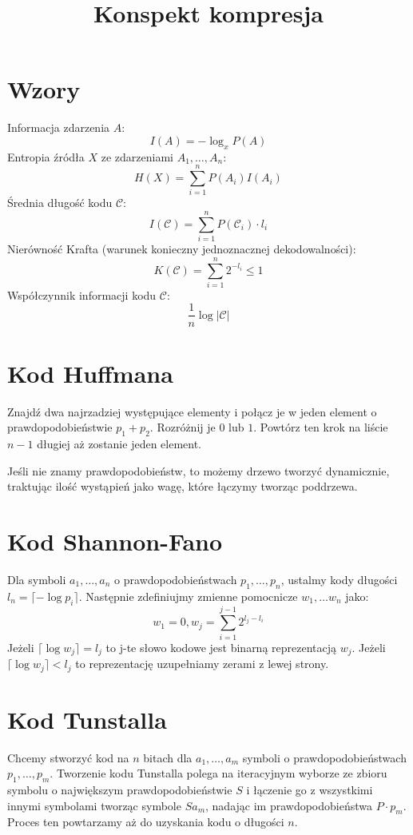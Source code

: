 \documentclass{../notatki}
\title{Konspekt kompresja}
\begin{document}
\begin{multicols}{2}

  \section{Wzory}

  Informacja zdarzenia $A$:
  $$
  I(A) = -\log_xP(A)
  $$
  Entropia źródła $X$ ze zdarzeniami $A_1, \dots, A_n$:
  $$
  H(X) = \sum_{i=1}^{n}P(A_i)I(A_i)
  $$
  Średnia długość kodu $\mathcal{C}$:
  $$
  I(\mathcal{C}) = \sum_{i=1}^{n}P(\mathcal{C}_i) \cdot l_i
  $$
  Nierówność Krafta (warunek konieczny jednoznacznej dekodowalności):
  $$
  K(\mathcal{C}) = \sum_{i=1}^{n}2^{-l_i} \leq 1
  $$
  Współczynnik informacji kodu $\mathcal{C}$:
  $$
  \frac{1}{n}\log|\mathcal{C}|
  $$

  \section{Kod Huffmana}

  Znajdź dwa najrzadziej występujące elementy i połącz je w jeden element
  o prawdopodobieństwie $p_1 + p_2$. Rozróżnij je $0$ lub $1$. Powtórz
  ten krok na liście $n-1$ długiej aż zostanie jeden element.

  Jeśli nie znamy prawdopodobieństw, to możemy drzewo tworzyć
  dynamicznie, traktując
  ilość wystąpień jako wagę, które łączymy tworząc poddrzewa.

  \section{Kod Shannon-Fano}

  Dla symboli $a_1, \dots, a_n$ o prawdopodobieństwach $p_1, \dots, p_n$,
  ustalmy kody długości $l_n = \lceil - \log p_i \rceil$. Następnie
  zdefiniujmy zmienne pomocnicze $w_1, \dots w_n$ jako:
  $$
  w_1 = 0, w_j = \sum_{i=1}^{j-1}2^{l_j - l_i}
  $$
  Jeżeli $\lceil \log w_j \rceil = l_j$ to j-te słowo kodowe jest binarną
  reprezentacją $w_j$. Jeżeli $\lceil \log w_j \rceil < l_j$ to reprezentację
  uzupełniamy zerami z lewej strony.

  \section{Kod Tunstalla}

  Chcemy stworzyć kod na $n$ bitach dla $a_1, \dots, a_m$ symboli o
  prawdopodobieństwach $p_1, \dots, p_m$. Tworzenie kodu Tunstalla polega na
  iteracyjnym wyborze ze zbioru symbolu o największym prawdopodobieństwie $S$
  i łączenie go z wszystkimi innymi symbolami tworząc symbole $Sa_m$, nadając im
  prawdopodobieństwa $P \cdot p_m$. Proces ten powtarzamy aż do uzyskania
  kodu o długości $n$.


\end{multicols}
\end{document}
